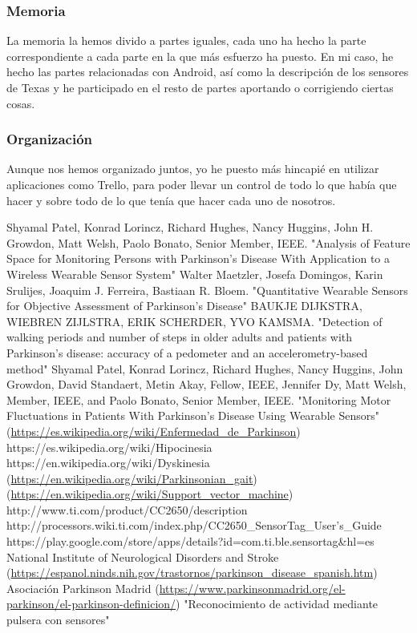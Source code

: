 \documentclass[11pt,spanish]{article}
\begin{document}
\subsubsection{Memoria} 
La memoria la hemos divido a partes iguales, cada uno ha hecho la parte correspondiente a cada parte en la que más esfuerzo ha puesto. En mi caso, he hecho las partes relacionadas con Android, así como la descripción de los sensores de Texas y he participado en el resto de partes aportando o corrigiendo ciertas cosas.

\subsubsection{Organización}
Aunque nos hemos organizado juntos, yo he puesto más hincapié en utilizar aplicaciones como Trello, para poder llevar un control de todo lo que había que hacer y sobre todo de lo que tenía que hacer cada uno de nosotros.

\newpage
\begin{thebibliography}{10}
    Shyamal Patel, Konrad Lorincz, Richard Hughes, Nancy Huggins, John H. Growdon, Matt Welsh, Paolo 		Bonato, Senior Member, IEEE. "Analysis of Feature Space for Monitoring Persons with Parkinson’s
	Disease With Application to a Wireless Wearable Sensor System"
    Walter Maetzler, Josefa Domingos, Karin Srulijes, Joaquim J. Ferreira, Bastiaan R. Bloem.       	     "Quantitative Wearable Sensors for Objective Assessment of Parkinson’s Disease"
    BAUKJE DIJKSTRA, WIEBREN ZIJLSTRA, ERIK SCHERDER, YVO KAMSMA. "Detection of walking periods and 	     number of steps in older adults and patients with Parkinson’s disease: accuracy of a pedometer and       an accelerometry-based method"
    Shyamal Patel, Konrad Lorincz, Richard Hughes, Nancy Huggins, John Growdon, David Standaert, Metin       Akay, Fellow, IEEE, Jennifer Dy, Matt Welsh, Member, IEEE, and Paolo Bonato, Senior Member, IEEE.       "Monitoring Motor Fluctuations in Patients With Parkinson’s Disease Using Wearable Sensors"
     (\url{https://es.wikipedia.org/wiki/Enfermedad_de_Parkinson})
     https://es.wikipedia.org/wiki/Hipocinesia
     https://en.wikipedia.org/wiki/Dyskinesia
     (\url {https://en.wikipedia.org/wiki/Parkinsonian_gait})
     (\url {https://en.wikipedia.org/wiki/Support_vector_machine})
     http://www.ti.com/product/CC2650/description
     http://processors.wiki.ti.com/index.php/CC2650\_SensorTag\_User's\_Guide
     https://play.google.com/store/apps/details?id=com.ti.ble.sensortag\&hl=es
     National Institute of Neurological Disorders and Stroke (\url{https://espanol.ninds.nih.gov/trastornos/parkinson_disease_spanish.htm})
     Asociación Parkinson Madrid (\url{https://www.parkinsonmadrid.org/el-parkinson/el-parkinson-definicion/})
     "Reconocimiento de actividad mediante pulsera con sensores"
\end{thebibliography}
\end{document}
